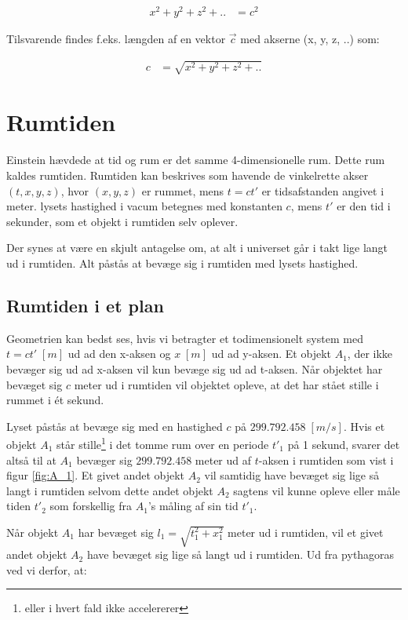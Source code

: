 \documentclass[11pt,a4paper]{memoir}
\begin{document}
\begin{equation}
\begin{aligned}
x^2 + y^2 + z^2 + .. &= c^2
\end{aligned}
\end{equation}

Tilsvarende findes f.eks. længden af en vektor $\vec{c}$  med akserne (x, y, z, ..) som:

\begin{equation}
\begin{aligned}
c &= \sqrt{x^2 + y^2 + z^2 + ..}
\end{aligned}
\end{equation}

\FloatBarrier

\section{Rumtiden}
Einstein hævdede at tid og rum er det samme 4-dimensionelle rum. Dette rum kaldes rumtiden. Rumtiden kan beskrives som havende de vinkelrette akser $(t, x, y, z)$, hvor $(x, y, z)$ er rummet, mens $t = ct'$ er tidsafstanden angivet i meter.  lysets hastighed i vacum betegnes med konstanten $c$, mens $t'$ er den tid i sekunder, som et objekt i rumtiden selv oplever.
\par
Der synes at være en skjult antagelse om, at alt i universet går i takt lige langt ud i rumtiden. Alt påstås at bevæge sig i rumtiden med lysets hastighed.

\subsection{Rumtiden i et plan}
Geometrien kan bedst ses, hvis vi betragter et todimensionelt system med $t = ct'\;[m]$ ud ad den x-aksen og $x\;[m]$ ud ad y-aksen. Et objekt $A_1$, der ikke bevæger sig ud ad x-aksen vil kun bevæge sig ud ad t-aksen. Når objektet har bevæget sig $c$ meter ud i rumtiden vil objektet opleve, at det har stået stille i rummet i ét sekund.
\par
Lyset påstås at bevæge sig med en hastighed $c$ på $299.792.458\;[m/s]$. Hvis et objekt $A_1$ står stille\footnote{eller i hvert fald ikke accelererer} i det tomme rum over en periode  $t'_1$ på 1 sekund, svarer det altså til at $A_1$ bevæger sig $299.792.458$ meter ud af $t$-aksen i rumtiden som vist i figur \ref{fig:A_1}. Et givet andet objekt $A_2$ vil samtidig have bevæget sig lige så langt i rumtiden selvom dette andet objekt $A_2$ sagtens vil kunne opleve eller måle tiden $t'_2$ som forskellig fra $A_1$'s måling af sin tid $t'_1$.
\par
Når objekt $A_1$ har bevæget sig $l_1 = \sqrt{t_1^2 + x_1^2}$ meter ud i rumtiden, vil et givet andet objekt $A_2$ have bevæget sig lige så langt ud i rumtiden. Ud fra pythagoras ved vi derfor, at:
\end{document}
